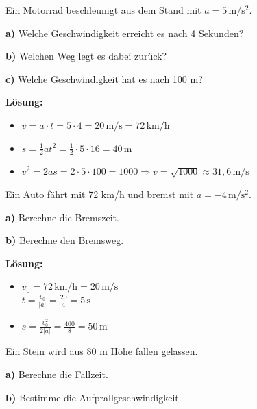 \documentclass[11pt,a4paper]{article}
\begin{document}
\vspace{0.5cm}

\begin{aufgabe}
Ein Motorrad beschleunigt aus dem Stand mit $a = 5\,\mathrm{m/s^2}$.

\textbf{a)} Welche Geschwindigkeit erreicht es nach 4 Sekunden?

\textbf{b)} Welchen Weg legt es dabei zurück?

\textbf{c)} Welche Geschwindigkeit hat es nach 100 m?
\end{aufgabe}

\textbf{Lösung:}
\begin{itemize}
\item[a)] $v = a \cdot t = 5 \cdot 4 = 20\,\mathrm{m/s} = 72\,\mathrm{km/h}$
\item[b)] $s = \frac{1}{2}at^2 = \frac{1}{2} \cdot 5 \cdot 16 = 40\,\mathrm{m}$
\item[c)] $v^2 = 2as = 2 \cdot 5 \cdot 100 = 1000 \Rightarrow v = \sqrt{1000} \approx 31{,}6\,\mathrm{m/s}$
\end{itemize}

\vspace{0.5cm}

\begin{aufgabe}
Ein Auto fährt mit 72 km/h und bremst mit $a = -4\,\mathrm{m/s^2}$.

\textbf{a)} Berechne die Bremszeit.

\textbf{b)} Berechne den Bremsweg.
\end{aufgabe}

\textbf{Lösung:}
\begin{itemize}
\item[a)] $v_0 = 72\,\mathrm{km/h} = 20\,\mathrm{m/s}$\\
$t = \frac{v_0}{|a|} = \frac{20}{4} = 5\,\mathrm{s}$
\item[b)] $s = \frac{v_0^2}{2|a|} = \frac{400}{8} = 50\,\mathrm{m}$
\end{itemize}

\vspace{0.5cm}

\begin{aufgabe}
Ein Stein wird aus 80 m Höhe fallen gelassen.

\textbf{a)} Berechne die Fallzeit.

\textbf{b)} Bestimme die Aufprallgeschwindigkeit.
\end{aufgabe}
\end{document}
